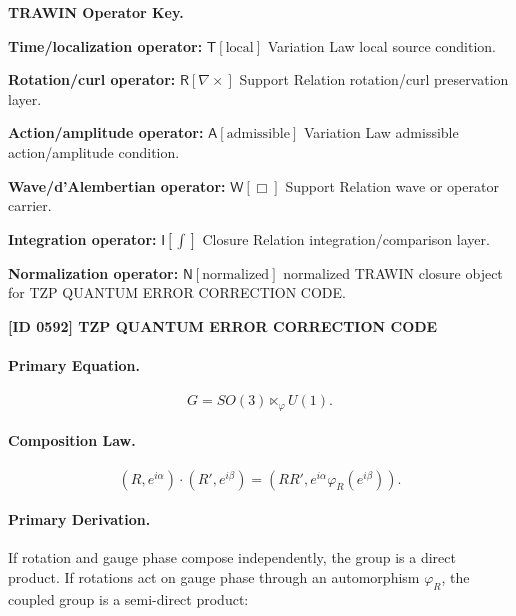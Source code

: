 \par\vspace{0.45\baselineskip}
\noindent\begin{minipage}[t]{\linewidth}
\begingroup
\small
\raggedright
\textbf{TRAWIN Operator Key.}\par
\noindent\textbf{Time/localization operator:} $\mathsf{T}\!\left[\mathrm{local}\right]$ Variation Law local source condition.\par
\noindent\textbf{Rotation/curl operator:} $\mathsf{R}\!\left[\nabla\times\right]$ Support Relation rotation/curl preservation layer.\par
\noindent\textbf{Action/amplitude operator:} $\mathsf{A}\!\left[\mathrm{admissible}\right]$ Variation Law admissible action/amplitude condition.\par
\noindent\textbf{Wave/d'Alembertian operator:} $\mathsf{W}\!\left[\Box\right]$ Support Relation wave or operator carrier.\par
\noindent\textbf{Integration operator:} $\mathsf{I}\!\left[\int\right]$ Closure Relation integration/comparison layer.\par
\noindent\textbf{Normalization operator:} $\mathsf{N}\!\left[\mathrm{normalized}\right]$ normalized TRAWIN closure object for TZP QUANTUM ERROR CORRECTION CODE.\par
\endgroup
\end{minipage}

\clearpage
\noindent\textbf{[ID 0592] TZP QUANTUM ERROR CORRECTION CODE}\par
\vspace{0.35em}
\paragraph{Primary Equation.}
\begin{equation}
G=SO(3)\ltimes_{\varphi} U(1).
\end{equation}

\paragraph{Composition Law.}
\begin{equation}
(R,e^{i\alpha})\cdot(R',e^{i\beta})
=
\left(
RR',
e^{i\alpha}\varphi_R(e^{i\beta})
\right).
\end{equation}

\paragraph{Primary Derivation.}
If rotation and gauge phase compose independently, the group is a direct product.  
If rotations act on gauge phase through an automorphism $\varphi_R$, the coupled group is a semi-direct product:

